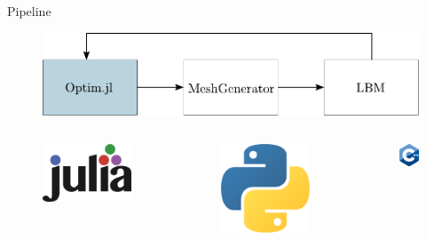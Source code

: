 \documentclass[aspectratio=169,xcolor=dvipsnames]{beamer}
\begin{document}
\begin{frame}{Pipeline}
	\addtocounter{framenumber}{-1}
	\begin{figure}
		\includegraphics[width=0.9\linewidth, trim={0 -0.1cm 0 0}, clip]{Images/pipeline1.pdf}
	\end{figure}
	\vspace{-2mm}
	\begin{columns}[T] %
		\begin{column}{.31\textwidth}
			\begin{figure}
				\includegraphics[width=0.5\linewidth, trim={0 0 0 0}, clip]{Images/julia.png}
			\end{figure}
		\end{column}%
		\begin{column}{.31\textwidth}
			\begin{figure}
				\includegraphics[width=0.35\linewidth, trim={0 0 0 0cm}, clip]{Images/python.png}
			\end{figure}
		\end{column}%
		\begin{column}{.31\textwidth}
			\begin{figure}
				\includegraphics[width=0.35\linewidth, trim={0 0 0 0cm}, clip]{Images/cpp.png}
			\end{figure}
		\end{column}%
	\end{columns}
\end{frame}
\end{document}
